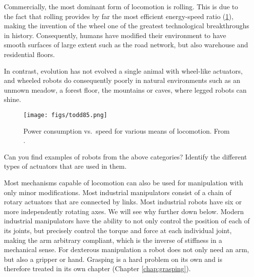 Commercially, the most dominant form of locomotion is rolling. This is due to the fact that rolling provides by far the most efficient energy-speed ratio (\cref{fig:todd}), making the invention of the wheel one of the greatest technological breakthroughs in history. Consequently, humans have modified their environment to have smooth surfaces of large extent such as the road network, but also warehouse and residential floors.

In contrast, evolution has not evolved a single animal with wheel-like actuators, and wheeled robots do consequently poorly in natural environments such as an unmown meadow, a forest floor, the mountains or caves, where legged robots can shine.  

\begin{figure}
    \centering
    \texttt{[image: figs/todd85.png]}
    \caption{Power consumption vs.\ speed for various means of locomotion. From \protect{}.}
    \label{fig:todd}
\end{figure}


\begin{mdframed}Can you find examples of robots from the above categories? Identify the different types of actuators that are used in them.
\end{mdframed}

Most mechanisms capable of locomotion can also be used for manipulation with only minor modifications. Most industrial manipulators consist of a chain of rotary actuators that are connected by links. Most industrial robots have six or more independently rotating axes. We will see why further down below. Modern industrial manipulators have the ability to not only control the position of each of its joints, but precisely control the torque and force at each individual joint, making the arm arbitrary compliant, which is the inverse of stiffness in a mechanical sense. For dexterous manipulation a robot does not only need an arm, but also a gripper or hand. Grasping is a hard problem on its own and is therefore treated in its own chapter (Chapter \ref{chap:grasping}).


